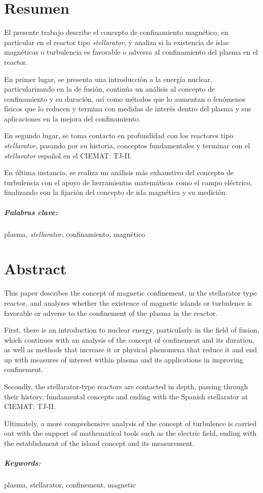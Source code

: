 \chapter*{Resumen}
El presente trabajo describe el concepto de confinamiento magnético, en particular en el reactor tipo \textit{stellarator}, y analiza si la existencia de islas magnéticas o turbulencia es favorable o adversa
al confinamiento del plasma en el reactor.\par
En primer lugar, se presenta una introducción a la energía nuclear, particularizando en la de fusión, continúa
un análisis al concepto de confinamiento y su duración, así como métodos que lo aumentan o fenómenos físicos que lo reducen y termina con medidas
de interés dentro del plasma y sus aplicaciones en la mejora del confinamiento.\par
En segundo lugar, se toma contacto en profundidad con los reactores tipo \textit{stellarator}, pasando por su historia, 
conceptos fundamentales y terminar con el \textit{stellarator} español en el CIEMAT: TJ-II.\par
En última instancia, se realiza un análisis más exhaustivo del concepto de turbulencia con el apoyo
de herramientas matemáticas como el campo eléctrico, finalizando con la fijación del concepto de isla
magnética y su medición.\par
\paragraph{Palabras clave:} plasma, \textit{stellarator}, confinamiento, magnético
\chapter*{Abstract}
This paper describes the concept of magnetic confinement, in the stellarator type reactor, and analyzes whether the existence of magnetic islands or turbulence is favorable or adverse
to the confinement of the plasma in the reactor.\par
First, there is an introduction to nuclear energy, particularly in the field of fusion, which continues with 
an analysis of the concept of confinement and its duration, as well as methods that increase it or physical 
phenomena that reduce it and end up with measures of interest within plasma and its applications in improving confinement.\par
Secondly, the stellarator-type reactors are contacted in depth, passing through their history, 
fundamental concepts and ending with the Spanish stellarator at CIEMAT: TJ-II.\par
Ultimately, a more comprehensive analysis of the concept of turbulence is carried out with the support
of mathematical tools such as the electric field, ending with the establishment of the island concept
and its measurement.\par
\paragraph{Keywords:} plasma, stellarator, confinement, magnetic